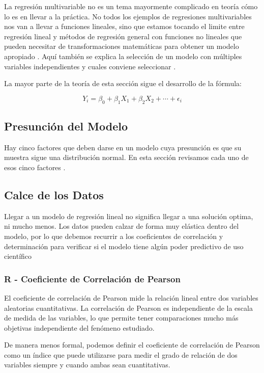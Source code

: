 \documentclass[letterpaper, spanish, 11pt]{report}
\begin{document}
La regresión multivariable no es un tema mayormente complicado en teoría cómo lo es en llevar a la práctica. No todos los ejemplos de regresiones multivariables nos van a llevar a funciones lineales, sino que estamos tocando el limite entre regresión lineal y métodos de regresión general con funciones no lineales que pueden necesitar de transformaciones matemáticas para obtener un modelo apropiado \cite{daroczi}. Aquí también se explica la selección de un modelo con múltiples variables independientes y cuales conviene seleccionar \cite{viswanathan}.

La mayor parte de la teoría de esta sección sigue el desarrollo de la fórmula:

\[Y_{i} = \beta_{0} + \beta_{1}X_{1} + \beta_{2}X_{2} + \cdots + \epsilon_{i}\]

\subsection{Presunción del Modelo}
Hay cinco factores que deben darse en un modelo cuya presunción es que su muestra sigue una distribución normal. En esta sección revisamos cada uno de esos cinco factores \cite{daroczi}.

\subsection{Calce de los Datos}
Llegar a un modelo de regresión lineal no significa llegar a una solución optima, ni mucho menos. Los datos pueden calzar de forma muy elástica dentro del modelo, por lo que debemos recurrir a los coeficientes de correlación y determinación para verificar si el modelo tiene algún poder predictivo de uso científico

\subsubsection{R - Coeficiente de Correlación de Pearson}
El coeficiente de correlación de Pearson mide la relación lineal entre dos variables aleatorias cuantitativas. La correlación de Pearson es independiente de la escala de medida de las variables, lo que permite tener comparaciones mucho más objetivas independiente del fenómeno estudiado.

De manera menos formal, podemos definir el coeficiente de correlación de Pearson como un índice que puede utilizarse para medir el grado de relación de dos variables siempre y cuando ambas sean cuantitativas.
\end{document}
